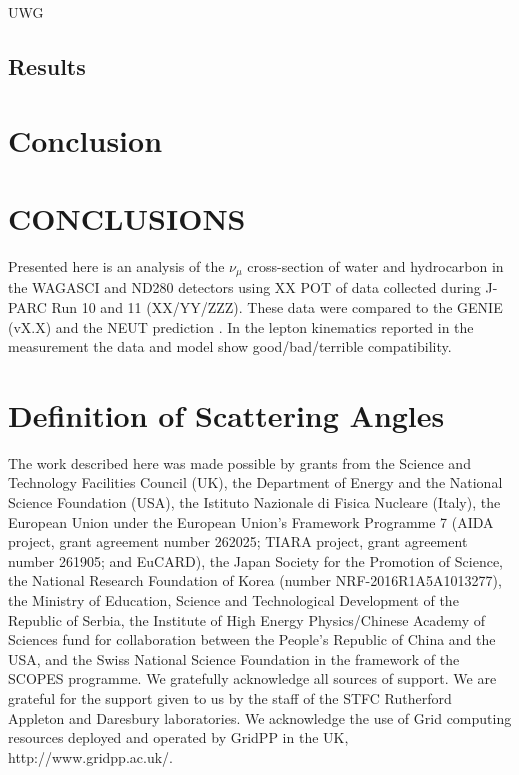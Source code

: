 \documentclass[%
 reprint,
 amsmath,amssymb,
 aps,
]{revtex4-2}
\begin{document}
\begin{frame}{UWG}
\subsection{Results}

\section{\label{Sect:Results}Conclusion}

\section{\label{Sect:Conclusions}CONCLUSIONS}

Presented here is an analysis of the $\nu_{\mu}$ cross-section of water and hydrocarbon in the WAGASCI and ND280 detectors using XX POT of data collected during J-PARC Run 10 and 11 (XX/YY/ZZZ). These data were compared to the GENIE (vX.X) \cite{} and the NEUT prediction \cite{}. In the lepton kinematics reported in the measurement the data and model show good/bad/terrible compatibility. 
\newpage
\appendix*

\section{\label{Sect:Appendix}Definition of Scattering Angles}


\begin{acknowledgments}
The work described here was made possible by grants from the Science and Technology Facilities Council (UK), the Department of Energy and the National Science Foundation (USA), the Istituto Nazionale di Fisica Nucleare (Italy), the European Union under the European Union’s Framework Programme 7 (AIDA project, grant agreement number 262025; TIARA project, grant agreement number 261905; and EuCARD), the Japan Society for the Promotion of Science, the National Research Foundation of Korea (number NRF-2016R1A5A1013277), the Ministry of Education, Science and Technological Development of the Republic of Serbia, the Institute of High Energy Physics/Chinese Academy of Sciences fund for collaboration between the People’s Republic of China and the USA, and the Swiss National Science Foundation in the framework of the SCOPES programme. We gratefully acknowledge all sources of support. We are grateful for the support given to us by the staff of the STFC Rutherford Appleton and Daresbury laboratories. We acknowledge the use of Grid computing resources deployed and operated by GridPP in the UK, http://www.gridpp.ac.uk/.


\end{acknowledgments}
\end{frame}
\end{document}
